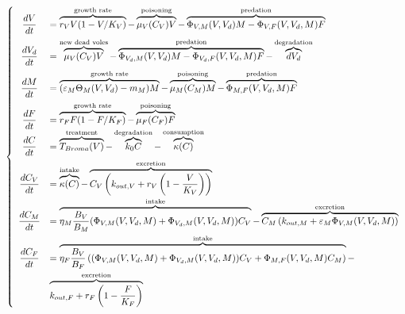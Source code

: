 \documentclass[11pt]{article}
\begin{document}
\begin{equation}
\left\lbrace
\begin{array}{c l}
\dfrac{dV}{dt} & =
\overbrace{	r_V V (1-V/K_V)		}^{\text{growth rate}} -
\overbrace{	\mu_V(C_V)V	}^{\text{poisoning}} -
\overbrace{	\Phi_{V,M}(V,V_d)M - \Phi_{V,F}(V,V_d,M)F	}^{\text{predation}}\\[3mm]
%
\dfrac{dV_d}{dt} & =
\overbrace{ \mu_V(C_V)V }^{\text{new dead voles}} -
\overbrace{	\Phi_{V_d,M}(V,V_d)M - \Phi_{V_d,F}(V,V_d,M)F	}^{\text{predation}}-
\overbrace{d V_d}^{\text{degradation}}
\\[3mm]
%
\dfrac{dM}{dt} & =
\overbrace{	(\varepsilon_M\Theta_M(V,V_d)-m_M) M	}^{\text{growth rate}} - 
\overbrace{\mu_M(C_M)M	}^{\text{poisoning}} -
\overbrace{\Phi_{M,F}(V,V_d,M)F }^{\text{predation}} \\[3mm]
%
\dfrac{dF}{dt} & =
\overbrace{	r_F F (1-F/K_F)	}^{\text{growth rate}} -
\overbrace{\mu_F(C_F)F	}^{\text{poisoning}}  \\
%
%
\dfrac{dC}{d t}  & = 
\overbrace{T_{Broma}(V)}^{\text{treatment}} - 
\overbrace{k_0 C}^{\text{degradation}} -
\overbrace{\kappa(C)}^{\text{consumption}} \\[3mm]
%
\dfrac{dC_V}{dt} &= 
\overbrace{\kappa(C)}^{\text{intake}} - 
\overbrace{C_V\left(k_{out,V} + r_V \left(1 - \dfrac{V}{K_V}\right)\right)}^{\text{excretion}}\\[3mm]
%
\dfrac{dC_M}{d t} & =
\overbrace{\eta_M \dfrac{B_V}{B_M} (\Phi_{V,M}(V,V_d,M)+\Phi_{V_d,M}(V,V_d,M)) C_V}^{\text{intake}} -
\overbrace{C_M\left(k_{out,M} + \varepsilon_M \Phi_{V,M}(V,V_d,M) \right)}^{\text{excretion}} \\[3mm]
%
\dfrac{dC_F}{d t} &=
\overbrace{ \eta_F \dfrac{B_V}{B_F} \left( (\Phi_{V,M}(V,V_d,M)+\Phi_{V_d,M}(V,V_d,M)) C_V + \Phi_{M,F}(V,V_d,M) C_M \right)}^{\text{intake}} - \\[3mm]
&
\overbrace{k_{out,F} + r_F \left(1 - \dfrac{F}{K_F}\right) }^{\text{excretion}} 
\end{array}
\right.
\label{eq:Sys_complet}
\end{equation}




%

%

\end{document}
